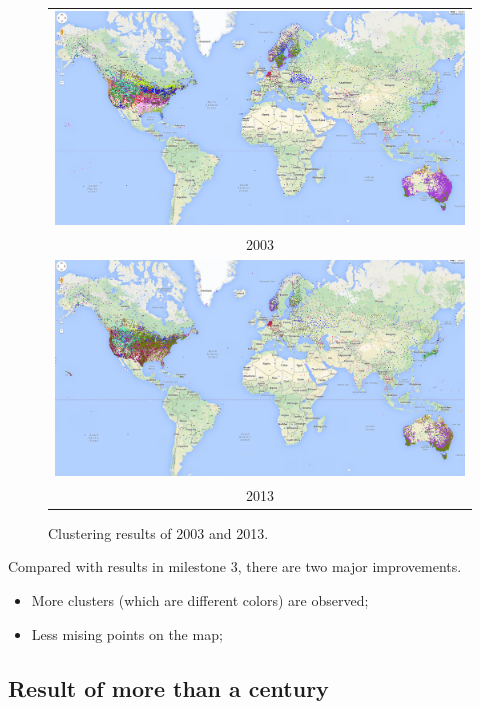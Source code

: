 \begin{figure}[htbp]
    \begin{tabular}{c}
        \includegraphics[width =\linewidth]{images/2003.png}\\2003\\
        \includegraphics[width =\linewidth]{images/2013.png}\\2013\\
    \end{tabular}
    \caption{Clustering results of 2003 and 2013.}
\end{figure}

Compared with results in milestone $3$, there are two major improvements.
\begin{itemize}
    \item More clusters (which are different colors) are observed;
    \item Less mising points on the map;
\end{itemize}

\subsection{Result of more than a century}

